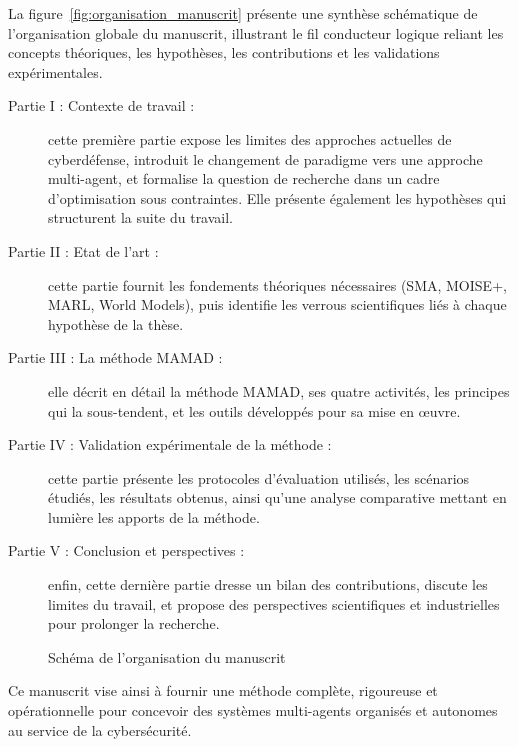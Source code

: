 \documentclass[ twoside,openright,titlepage,numbers=noenddot,headinclude,%
                footinclude=true,cleardoublepage=empty,abstractoff, %
                BCOR=5mm,paper=a4,fontsize=11pt,%
                french,american,%
                ]{scrreprt}
\begin{document}
La figure~\autoref{fig:organisation_manuscrit} présente une synthèse schématique de l'organisation globale du manuscrit, illustrant le fil conducteur logique reliant les concepts théoriques, les hypothèses, les contributions et les validations expérimentales.
%
\begin{description}
    \item[Partie I : Contexte de travail :] cette première partie expose les limites des approches actuelles de cyberdéfense, introduit le changement de paradigme vers une approche multi-agent, et formalise la question de recherche dans un cadre d'optimisation sous contraintes. Elle présente également les hypothèses qui structurent la suite du travail.
    
    \item[Partie II : Etat de l'art :] cette partie fournit les fondements théoriques nécessaires (SMA, MOISE+, MARL, World Models), puis identifie les verrous scientifiques liés à chaque hypothèse de la thèse.

    \item[Partie III : La méthode MAMAD :] elle décrit en détail la méthode MAMAD, ses quatre activités, les principes qui la sous-tendent, et les outils développés pour sa mise en œuvre.

    \item[Partie IV : Validation expérimentale de la méthode :] cette partie présente les protocoles d'évaluation utilisés, les scénarios étudiés, les résultats obtenus, ainsi qu'une analyse comparative mettant en lumière les apports de la méthode.

    \item[Partie V : Conclusion et perspectives :] enfin, cette dernière partie dresse un bilan des contributions, discute les limites du travail, et propose des perspectives scientifiques et industrielles pour prolonger la recherche.
\end{description}
%
\vspace{1em}
%
\begin{figure}[h!]
    \centering
    \resizebox{\textwidth}{!}{%
        
    }
    \caption{Schéma de l'organisation du manuscrit}
    \label{fig:organisation_manuscrit}
\end{figure}
%
Ce manuscrit vise ainsi à fournir une méthode complète, rigoureuse et opérationnelle pour concevoir des systèmes multi-agents organisés et autonomes au service de la cybersécurité.

\cleardoublepage
\end{document}
